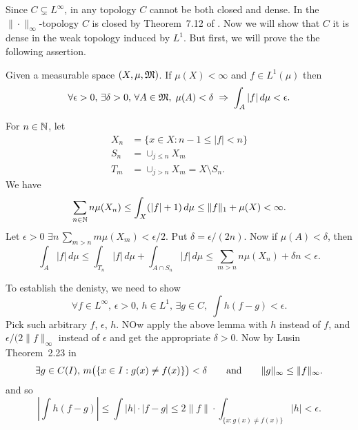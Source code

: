 \begin{enumerate}
Since \(C \subsetneq L^\infty\),
in any topology $C$ cannot be both closed and dense.
In the \(\|\cdot\|_\infty\)-topology $C$ is closed by
Theorem~7.12 of \cite{RudinPMA85}.
Now we will show that $C$ it is dense in the weak topology induced by \(L^1\).
But first, we will prove the the following assertion.
\begin{llem}
Given a measurable space \((X,\mu,\mathfrak{M})\).
If \(\mu(X)<\infty\) and \(f\in L^1(\mu)\) then
\begin{equation*}
\forall \epsilon>0,\, \exists \delta>0,\, \forall A\in\mathfrak{M}, \;
  \mu(A) < \delta \;\Rightarrow\; \int_A|f|\,d\mu < \epsilon.
\end{equation*}
\end{llem}
\begin{thmproof}
For \(n\in\mathbb{N}\), let
\begin{align*}
X_n &= \{x\in X: n-1 \leq |f|<n\} \\
S_n &= \cup_{j\leq n} X_m \\
T_m &= \cup_{j>n} X_m = X \setminus S_n.
\end{align*}
We have
\begin{equation*}
\sum_{n\in\mathbb{N}} n\mu(X_n) \leq \int_X(|f|+1)\,d\mu \leq \|f\|_1+\mu(X) < \infty.
\end{equation*}
Let \(\epsilon>0\) \(\exists n\, \sum_{m>n} m\mu(X_m) < \epsilon/2\).
Put \(\delta = \epsilon/(2n)\).
Now if \(\mu(A)<\delta\), then
\begin{equation*}
\int_A|f|\,d\mu
\leq \int_{T_n} |f|\,d\mu +  \int_{A\cap S_n} |f|\,d\mu
\leq \sum_{m>n} n\mu(X_n) + \delta n < \epsilon.
\end{equation*}
\end{thmproof}

To establish the denisty, we need to show
\begin{equation*}
\forall f\in L^\infty,\,\epsilon>0,\,h\in L^1,\,\exists g\in C,
\; \int h(f-g)<\epsilon.
\end{equation*}
Pick such arbitrary $f$, \(\epsilon\), $h$.
NOw apply the above lemma with $h$ instead of $f$,
and \(\epsilon/(2\|f\|_\infty\) instead of \(\epsilon\) and get the appropriate
\(\delta>0\). Now by
Lusin Theorem~2.23 in \cite{RudinRCA87}
\begin{equation*}
\exists g\in C(I),\, m\bigl(\{x\in I: g(x)\neq f(x)\}\bigr) < \delta
\qquad \textnormal{and} \qquad \|g\|_\infty \leq \|f\|_\infty.
\end{equation*}
and so
\begin{equation*}
\left|\int h(f-g)\right|
\leq \int |h|\cdot|f-g| \leq 2\|f\|\cdot \int_{\{x: g(x)\neq f(x)\}} |h| < \epsilon.
\end{equation*}


\end{enumerate}
